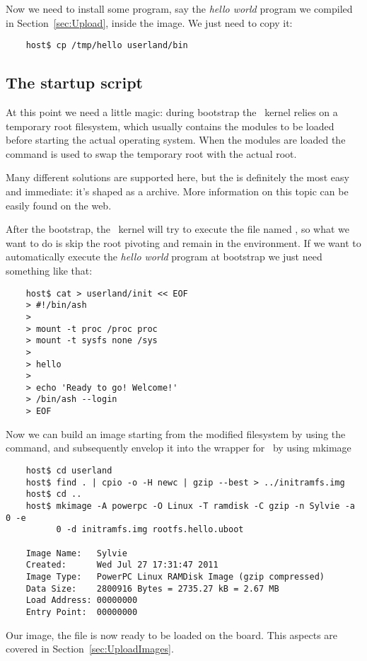     Now we need to install some program, say the \emph{hello world}
    program we compiled in Section~\ref{sec:Upload}, inside the image. We
    just need to copy it:

\begin{lstlisting}
    host$ cp /tmp/hello userland/bin
\end{lstlisting}

\subsection{The startup script}

    At this point we need a little magic: during bootstrap the \Linux\
    kernel relies on a temporary root filesystem, which usually contains
    the modules to be loaded before starting the actual operating system.
    When the modules are loaded the \Command{pivot\_root} command is used
    to swap the temporary root with the actual root.

    Many different solutions are supported here, but the
     is definitely the most easy and immediate: it's
    shaped as a \StdName{gzipped cpio} archive. More information on this
    topic can be easily found on the web.

    After the bootstrap, the \Linux\ kernel will try to execute the file
    named \FileName{/init}, so what we want to do is skip the root
    pivoting and remain in the \StdName{initramfs} environment. If we want
    to automatically execute the \emph{hello world} program at bootstrap
    we just need something like that:

\begin{lstlisting}
    host$ cat > userland/init << EOF
    > #!/bin/ash
    >
    > mount -t proc /proc proc
    > mount -t sysfs none /sys
    >
    > hello
    >
    > echo 'Ready to go! Welcome!'
    > /bin/ash --login
    > EOF
\end{lstlisting}

    Now we can build an  image starting from the
    modified filesystem by using the \Command{cpio} command, and
    subsequently envelop it into the wrapper for \uBoot\ by using mkimage

\begin{lstlisting}
    host$ cd userland
    host$ find . | cpio -o -H newc | gzip --best > ../initramfs.img
    host$ cd ..
    host$ mkimage -A powerpc -O Linux -T ramdisk -C gzip -n Sylvie -a 0 -e
          0 -d initramfs.img rootfs.hello.uboot

    Image Name:   Sylvie
    Created:      Wed Jul 27 17:31:47 2011
    Image Type:   PowerPC Linux RAMDisk Image (gzip compressed)
    Data Size:    2800916 Bytes = 2735.27 kB = 2.67 MB
    Load Address: 00000000
    Entry Point:  00000000
\end{lstlisting}

    Our image, the file  is now ready to be
    loaded on the board. This aspects are covered in
    Section~\ref{sec:UploadImages}.

